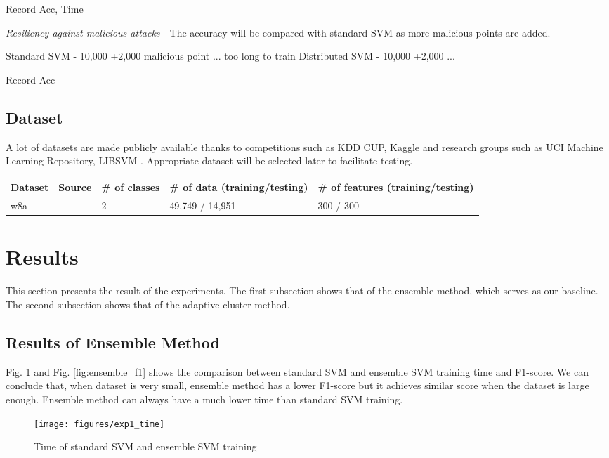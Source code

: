 \documentclass[10pt,conference,compsocconf,letterpaper]{IEEEtran}
\begin{document}
Record Acc, Time

\textit{Resiliency against malicious attacks} - The accuracy will be compared with standard SVM as more malicious points are added.

Standard SVM    - 10,000 +2,000 malicious point ... too long to train
Distributed SVM - 10,000 +2,000 ... 

Record Acc

\subsection{Dataset}
A lot of datasets are made publicly available thanks to competitions such as KDD CUP, Kaggle and research groups such as UCI Machine Learning Repository, LIBSVM \cite{kddcup,kaggle,uci,libsvm}. Appropriate dataset will be selected later to facilitate testing.

\begin{table*}[t]
\centering
\begin{tabular}{|l|l|l|l|l|}
\hline
Dataset&Source & \# of classes & \# of data (training/testing) & \# of features (training/testing) \\
\hline
w8a&\cite{jp98} & 2 & 49,749 / 14,951 & 300 / 300 \\
\hline
\end{tabular}
\end{table*}

\section{Results}

This section presents the result of the experiments. The first subsection shows that of the ensemble method, which serves as our baseline. The second subsection shows that of the adaptive cluster method.

\subsection{Results of Ensemble Method}
Fig. \ref{fig:ensemble_time} and Fig. \ref{fig:ensemble_f1} shows the comparison between standard SVM and ensemble SVM training time and F1-score. We can conclude that, when dataset is very small, ensemble method has a lower F1-score but it achieves similar score when the dataset is large enough. Ensemble method can always have a much lower time than standard SVM training.
\begin{figure}[h]
  \centering
  \label{fig:ensemble_time}
  \texttt{[image: figures/exp1\_time]}
  \caption{Time of standard SVM and ensemble SVM training}
\end{figure}
\end{document}
